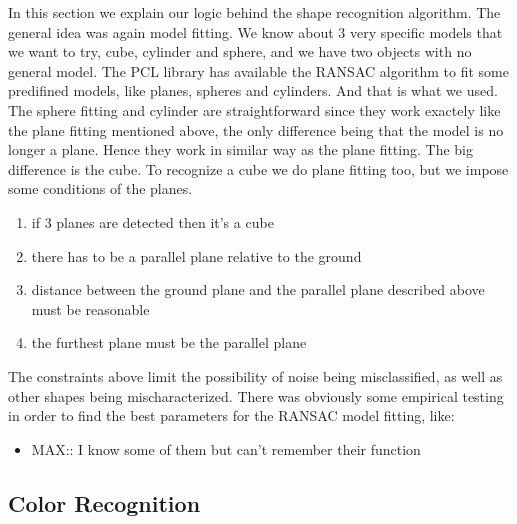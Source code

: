 In this section we explain our logic behind the shape recognition algorithm.
The general idea was again model fitting.
We know about 3 very specific models that we want to try, cube, cylinder and sphere, and we have two objects with no general model.
The PCL library has available the RANSAC algorithm to fit some predifined models, like planes, spheres and cylinders. 
And that is what we used. 
The sphere fitting and cylinder are straightforward since they work exactely like the plane fitting mentioned above, the only difference being that the model is no longer a plane.
Hence they work in similar way as the plane fitting.
The big difference is the cube.
To recognize a cube we do plane fitting too, but we impose some conditions of the planes.

\begin{enumerate}
\item if 3 planes are detected then it's a cube
\item there has to be a parallel plane relative to the ground
\item distance between the ground plane and the parallel plane described above must be reasonable
\item the furthest plane must be the parallel plane
\end{enumerate}

The constraints above limit the possibility of noise being misclassified, as well as other shapes being mischaracterized.
There was obviously some empirical testing in order to find the best parameters for the RANSAC model fitting, like: 

\begin{itemize}
\item MAX:: I know some of them but can't remember their function
\end{itemize}


\subsection{Color Recognition}

